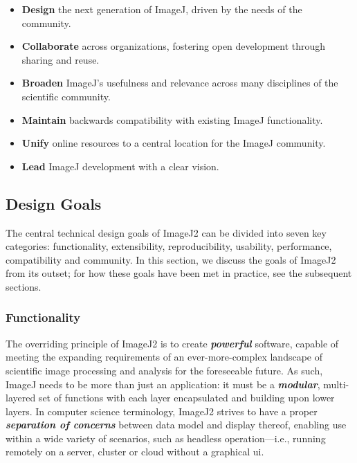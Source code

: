 \documentclass{bmcart}
\begin{document}
\begin{itemize}
  \item \textbf{Design} the next generation of ImageJ, driven by the needs of
    the community.
  \item \textbf{Collaborate} across organizations, fostering open development
    through sharing and reuse.
  \item \textbf{Broaden} ImageJ's usefulness and relevance across many
    disciplines of the scientific community.
  \item \textbf{Maintain} backwards compatibility with existing ImageJ
    functionality.
  \item \textbf{Unify} online resources to a central location for the ImageJ
    community.
  \item \textbf{Lead} ImageJ development with a clear vision.
\end{itemize}


\subsection*{Design Goals}
The central technical design goals of ImageJ2 can be divided into seven key
categories: functionality, extensibility, reproducibility, usability,
performance, compatibility and community. In this section, we discuss the goals
of ImageJ2 from its outset; for how these goals have been met in practice, see
the subsequent sections.

\subsubsection*{Functionality}
The overriding principle of ImageJ2 is to create \textbf{\textit{powerful}}
software, capable of meeting the expanding requirements of an ever-more-complex
landscape of scientific image processing and analysis for the foreseeable
future. As such, ImageJ needs to be more than just an application: it must be a
\textbf{\textit{modular}}, multi-layered set of functions with each layer
encapsulated and building upon lower layers. In computer science terminology,
ImageJ2 strives to have a proper \textbf{\textit{separation of concerns}}
between data model and display thereof, enabling use within a wide variety of
scenarios, such as headless operation---i.e., running remotely on a server,
cluster or cloud without a graphical \acrfull{ui}.
\end{document}
